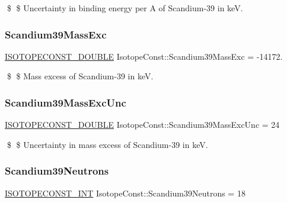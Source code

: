 \$ \$ Uncertainty in binding energy per A of Scandium-\/39 in keV. \mbox{\label{group___isotope_const-_scandium-_sc39_ga675a0b6350197a25745c7815ee98ffde}} 
\subsubsection{\texorpdfstring{Scandium39\+Mass\+Exc}{Scandium39MassExc}}
{\footnotesize\ttfamily \mbox{\hyperlink{group___isotope_const-_macros_ga8f45a7272ce02c0b4c65c44636ed719a}{I\+S\+O\+T\+O\+P\+E\+C\+O\+N\+S\+T\+\_\+\+D\+O\+U\+B\+LE}} Isotope\+Const\+::\+Scandium39\+Mass\+Exc = -\/14172.}

\$ \$ Mass excess of Scandium-\/39 in keV. \mbox{\label{group___isotope_const-_scandium-_sc39_ga7af237a899f78de157c70b89870f8816}} 
\subsubsection{\texorpdfstring{Scandium39\+Mass\+Exc\+Unc}{Scandium39MassExcUnc}}
{\footnotesize\ttfamily \mbox{\hyperlink{group___isotope_const-_macros_ga8f45a7272ce02c0b4c65c44636ed719a}{I\+S\+O\+T\+O\+P\+E\+C\+O\+N\+S\+T\+\_\+\+D\+O\+U\+B\+LE}} Isotope\+Const\+::\+Scandium39\+Mass\+Exc\+Unc = 24}

\$ \$ Uncertainty in mass excess of Scandium-\/39 in keV. \mbox{\label{group___isotope_const-_scandium-_sc39_ga6c54ba41152b03f3d46ef8cc97fbd40f}} 
\subsubsection{\texorpdfstring{Scandium39\+Neutrons}{Scandium39Neutrons}}
{\footnotesize\ttfamily \mbox{\hyperlink{group___isotope_const-_macros_ga5f18360b3e99483a35c32d789e62621c}{I\+S\+O\+T\+O\+P\+E\+C\+O\+N\+S\+T\+\_\+\+I\+NT}} Isotope\+Const\+::\+Scandium39\+Neutrons = 18}

